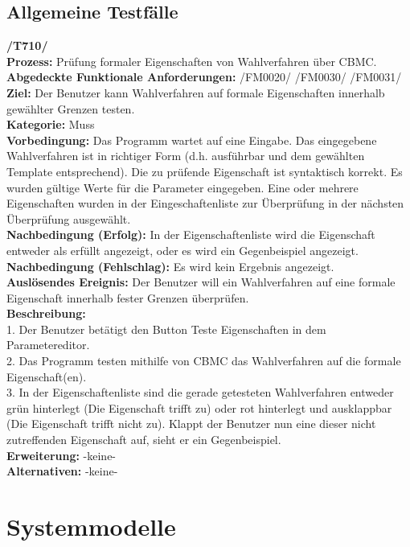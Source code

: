 \documentclass[a4paper]{scrreprt}
\begin{document}
\section{Allgemeine Testfälle}
\textbf{/T710/} \\
\textbf{Prozess: }Prüfung formaler Eigenschaften von Wahlverfahren über CBMC.\\
\textbf{Abgedeckte Funktionale Anforderungen:} /FM0020/ /FM0030/ /FM0031/ \\
\textbf{Ziel:} Der Benutzer kann Wahlverfahren auf formale Eigenschaften innerhalb gewählter Grenzen testen.\\
\textbf{Kategorie:} Muss\\
\textbf{Vorbedingung:} Das Programm wartet auf eine Eingabe. Das eingegebene Wahlverfahren ist in richtiger Form (d.h. ausführbar und dem gewählten Template entsprechend). Die zu prüfende Eigenschaft ist syntaktisch korrekt. Es wurden gültige Werte für die Parameter eingegeben. Eine oder mehrere Eigenschaften wurden in der Eingeschaftenliste zur Überprüfung in der nächsten Überprüfung ausgewählt. \\
\textbf{Nachbedingung (Erfolg):} In der Eigenschaftenliste wird die Eigenschaft entweder als erfüllt angezeigt, oder es wird ein Gegenbeispiel angezeigt.\\
\textbf{Nachbedingung (Fehlschlag):} Es wird kein Ergebnis angezeigt.\\
\textbf{Auslösendes Ereignis:} Der Benutzer will ein Wahlverfahren auf eine formale Eigenschaft innerhalb fester Grenzen überprüfen.\\
\textbf{Beschreibung:} \\
1. Der Benutzer betätigt den Button Teste Eigenschaften in dem Parametereditor. \\
2. Das Programm testen mithilfe von CBMC das Wahlverfahren auf die formale Eigenschaft(en). \\
3. In der Eigenschaftenliste sind die gerade getesteten Wahlverfahren entweder grün hinterlegt (Die Eigenschaft trifft zu) oder rot hinterlegt und ausklappbar (Die Eigenschaft trifft nicht zu). Klappt der Benutzer nun eine dieser nicht zutreffenden Eigenschaft auf, sieht er ein Gegenbeispiel. \\
\textbf {Erweiterung:} -keine- \\
\textbf {Alternativen:} -keine- \\

\chapter{Systemmodelle}
\end{document}
